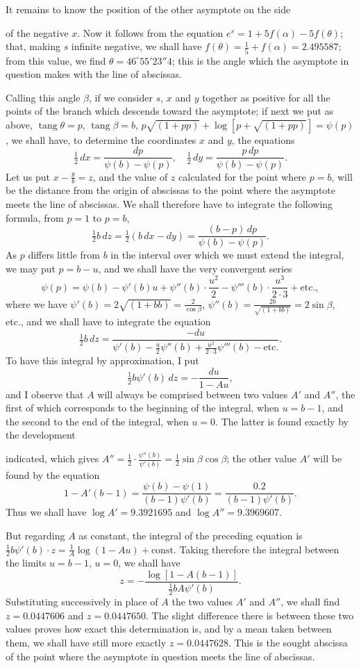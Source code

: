\documentclass{article}
\begin{document}
It remains to know the position of the other asymptote on the side

of the negative $x$. Now it follows from the equation $e^{s}=1+5f(\alpha)-5f(\theta)$; that, making $s$ infinite negative, we shall have $f(\theta)=\frac{1}{5}+f(\alpha)=2.495587$; from this value, we find $\theta=46^{\circ}55'23''4$; this is the angle which the asymptote in question makes with the line of abscissas.

Calling this angle $\beta$, if we consider $s$, $x$ and $y$ together as positive for all the points of the branch which descends toward the asymptote; if next we put as above, $\operatorname{tang}\theta=p$, $\operatorname{tang}\beta=b$, $p\sqrt{(1+pp)}+\log[p+\sqrt{(1+pp)}]=\psi(p)$, we shall have, to determine the coordinates $x$ and $y$, the equations
\[ \tfrac{1}{2}\,dx=\frac{dp}{\psi(b)-\psi(p)},\quad \tfrac{1}{2}\,dy=\frac{p\,dp}{\psi(b)-\psi(p)}. \]
Let us put $x-\frac{y}{b}=z$, and the value of $z$ calculated for the point where $p=b$, will be the distance from the origin of abscissas to the point where the asymptote meets the line of abscissas. We shall therefore have to integrate the following formula, from $p=1$ to $p=b$,
\[ \tfrac{1}{2}b\,dz=\tfrac{1}{2}(b\,dx-dy)=\frac{(b-p)\,dp}{\psi(b)-\psi(p)}. \]
As $p$ differs little from $b$ in the interval over which we must extend the integral, we may put $p=b-u$, and we shall have the very convergent series
\[ \psi(p)=\psi(b)-\psi'(b)u+\psi''(b)\cdot\frac{u^{2}}{2}-\psi'''(b)\cdot\frac{u^{3}}{2\cdot3}+\text{etc.}, \]
where we have $\psi'(b)=2\sqrt{(1+bb)}=\frac{2}{\cos\beta}$, $\psi''(b)=\frac{2b}{\sqrt{(1+bb)}}=2\sin\beta$, etc., and we shall have to integrate the equation
\[ \tfrac{1}{2}b\,dz=\frac{-du}{\psi'(b)-\frac{u}{2}\psi''(b)+\frac{u^{2}}{2\cdot3}\psi'''(b)-\text{etc.}}. \]
To have this integral by approximation, I put
\[ \tfrac{1}{2}b\psi'(b)\,dz=-\frac{du}{1-Au}, \]
and I observe that $A$ will always be comprised between two values $A'$ and $A''$, the first of which corresponds to the beginning of the integral, when $u=b-1$, and the second to the end of the integral, when $u=0$. The latter is found exactly by the development

indicated, which gives $A''=\frac{1}{2}\cdot\frac{\psi''(b)}{\psi'(b)}=\frac{1}{2}\sin\beta\cos\beta$; the other value $A'$ will be found by the equation
\[ 1-A'(b-1)=\frac{\psi(b)-\psi(1)}{(b-1)\psi'(b)}=\frac{0.2}{(b-1)\psi'(b)}. \]
Thus we shall have $\log A'=9.3921695$ and $\log A''=9.3969607$.

But regarding $A$ as constant, the integral of the preceding equation is $\frac{1}{2}b\psi'(b)\cdot z=\frac{1}{A}\log(1-Au)+\text{const.}$ Taking therefore the integral between the limits $u=b-1$, $u=0$, we shall have
\[ z=-\frac{\log[1-A(b-1)]}{\frac{1}{2}bA\psi'(b)}. \]
Substituting successively in place of $A$ the two values $A'$ and $A''$, we shall find $z=0.0447606$ and $z=0.0447650$. The slight difference there is between these two values proves how exact this determination is, and by a mean taken between them, we shall have still more exactly $z=0.0447628$. This is the sought abscissa of the point where the asymptote in question meets the line of abscissas.
\end{document}
